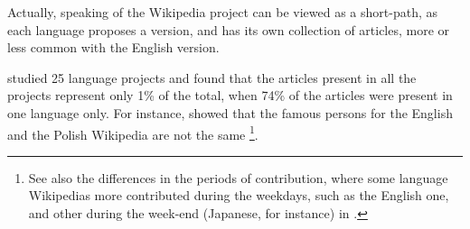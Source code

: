 Actually, speaking of the Wikipedia project can be viewed as a short-path,
as each language proposes a version, and has its own collection of
articles, more or less common with the English version.


\citet{HechtGergle10} studied 25 language projects and found that
the articles present in all the projects represent only 1\% of the
total, when 74\% of the articles were present in one language only.
For instance, \citet{CallahanHerring11} showed that the famous persons
for the English and the Polish Wikipedia are not the same \footnote{See also the differences in the periods of contribution, where some
language Wikipedias more contributed during the weekdays, such as
the English one, and other during the week-end (Japanese, for instance)
in \citep{YasseriSumiKertesz12}.}. 

